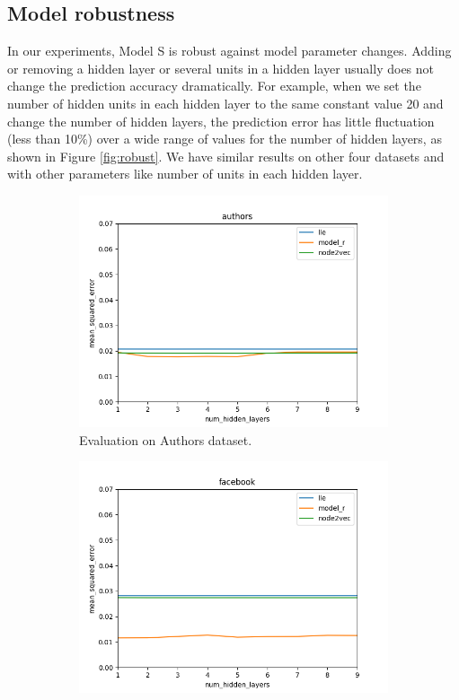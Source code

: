 \documentclass{article} %
\begin{document}
\subsection{Model robustness}
In our experiments, Model S is robust against model parameter changes. Adding or removing a hidden layer or several units in a hidden layer usually does not change the prediction accuracy dramatically.
For example, when we set the number of hidden units in each hidden layer to the same constant value 20 and change the number of hidden layers,
the prediction error has little fluctuation (less than 10\%) over a wide range of values for the number of hidden layers,
as shown in Figure \ref{fig:robust}.
We have similar results on other four datasets and with other parameters like number of units in each hidden layer.
\begin{figure}[h] \centering
	\begin{subfigure}{0.49 \linewidth}
		\includegraphics[width=\linewidth]{authors}
		\caption{Evaluation on Authors dataset.}
		\label{fig:movieLens100K}
	\end{subfigure}
	\begin{subfigure}{0.49 \linewidth}
		\includegraphics[width=\linewidth]{facebook}

\end{subfigure}
\end{figure}
\end{document}
